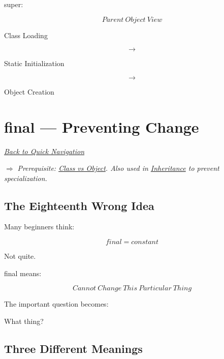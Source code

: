 \documentclass[11pt,a4paper]{book}
\begin{document}
super:

\[
Parent\ Object\ View
\]


Class Loading

\[
\rightarrow
\]

Static Initialization

\[
\rightarrow
\]

Object Creation

\chapter{final --- Preventing Change}\label{chap:final}

\smallskip
\noindent
\hyperref[sec:quick_nav]{\emph{Back to Quick Navigation}}

\smallskip
\noindent
\textcolor{RosettaRoyalPurple}{$\Rightarrow$}
\emph{Prerequisite: \hyperref[chap:class_vs_object]{Class vs Object}. Also used in \hyperref[chap:inheritance]{Inheritance} to prevent specialization.}

\section{The Eighteenth Wrong Idea}

\begin{trap}

Many beginners think:

\[
final
=
constant
\]

Not quite.


final means:

\[
Cannot\ Change\ This\ Particular\ Thing
\]


The important question becomes:

\begin{center}
What thing?
\end{center}

\end{trap}


\section{Three Different Meanings}
\end{document}

